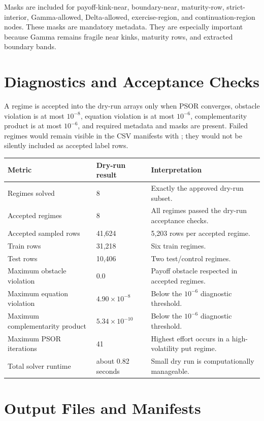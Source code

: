 \documentclass[11pt,a4paper]{article}
\newcommand{\code}[1]{\path{#1}}
\begin{document}
Masks are included for payoff-kink-near, boundary-near, maturity-row, strict-interior,
Gamma-allowed, Delta-allowed, exercise-region, and continuation-region nodes. These masks are
mandatory metadata. They are especially important because Gamma remains fragile near kinks,
maturity rows, and extracted boundary bands.

\section{Diagnostics and Acceptance Checks}

A regime is accepted into the dry-run arrays only when PSOR converges, obstacle violation is at
most \(10^{-8}\), equation violation is at most \(10^{-6}\), complementarity product is at most
\(10^{-6}\), and required metadata and masks are present. Failed regimes would remain visible in
the CSV manifests with \code{review_required}; they would not be silently included as accepted
label rows.

\begin{longtable}{L{0.36\textwidth} L{0.22\textwidth} L{0.30\textwidth}}
\toprule
Metric & Dry-run result & Interpretation \\
\midrule
\endhead
Regimes solved & 8 & Exactly the approved dry-run subset. \\
Accepted regimes & 8 & All regimes passed the dry-run acceptance checks. \\
Accepted sampled rows & 41,624 & 5,203 rows per accepted regime. \\
Train rows & 31,218 & Six train regimes. \\
Test rows & 10,406 & Two test/control regimes. \\
Maximum obstacle violation & \(0.0\) & Payoff obstacle respected in accepted regimes. \\
Maximum equation violation & \(4.90\times 10^{-8}\) & Below the \(10^{-6}\) diagnostic threshold. \\
Maximum complementarity product & \(5.34\times 10^{-10}\) & Below the \(10^{-6}\) diagnostic threshold. \\
Maximum PSOR iterations & 41 & Highest effort occurs in a high-volatility put regime. \\
Total solver runtime & about 0.82 seconds & Small dry run is computationally manageable. \\
\bottomrule
\end{longtable}

\section{Output Files and Manifests}
\end{document}
